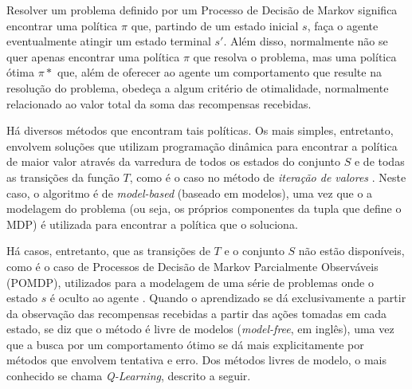 \documentclass[cic,tc]{iiufrgs}
\begin{document}
Resolver um problema definido por um Processo de Decisão de Markov significa
encontrar uma política $\pi$ que, partindo de um estado inicial $s$, faça o
agente eventualmente atingir um estado terminal $s'$. Além disso, normalmente
não se quer apenas encontrar uma política $\pi$ que resolva o problema, mas uma
política ótima $\pi*$ que, além de oferecer ao agente um comportamento que
resulte na resolução do problema, obedeça a algum critério de otimalidade,
normalmente relacionado ao valor total da soma das recompensas recebidas.

Há diversos métodos que encontram tais políticas. Os mais simples, entretanto,
envolvem soluções que utilizam programação dinâmica para encontrar a política de
maior valor através da varredura de todos os estados do conjunto $S$ e de todas
as transições da função $T$, como é o caso no método de \textit{iteração de
valores} \cite{ValueIteration}. Neste caso, o algoritmo é de \textit{model-based}
(baseado em modelos), uma vez que o a modelagem do problema (ou seja, os
próprios componentes da tupla que define o MDP) é utilizada para encontrar a
política que o soluciona.

Há casos, entretanto, que as transições de $T$ e o conjunto $S$ não estão
disponíveis, como é o caso de Processos de Decisão de Markov Parcialmente
Observáveis (POMDP), utilizados para a modelagem de uma série de problemas onde
o estado $s$ é oculto ao agente \cite{Cassandra1998}. Quando o aprendizado se
dá exclusivamente a partir da observação
das recompensas recebidas a partir das ações tomadas em cada estado, se diz que
o método é livre de modelos (\textit{model-free}, em inglês), uma vez que a
busca por um comportamento ótimo se dá mais explicitamente por métodos que
envolvem tentativa e erro. Dos métodos livres de modelo, o mais conhecido se
chama \textit{Q-Learning}, descrito a seguir.
\end{document}
